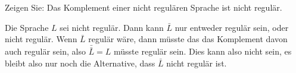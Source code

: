 Zeigen Sie: Das Komplement einer nicht regulären Sprache ist nicht
regulär.

\begin{loesung}
Die Sprache $L$ sei nicht regulär. Dann kann $\bar L$ nur
entweder regulär sein, oder nicht regulär. Wenn $\bar L$
regulär wäre, dann müsste das das Komplement davon
auch regulär sein, also $\bar{\bar L}=L$ müsste regulär sein.
Dies kann also nicht sein, es bleibt also nur noch die Alternative,
dass $\bar L$ nicht regulär ist.
\end{loesung}
